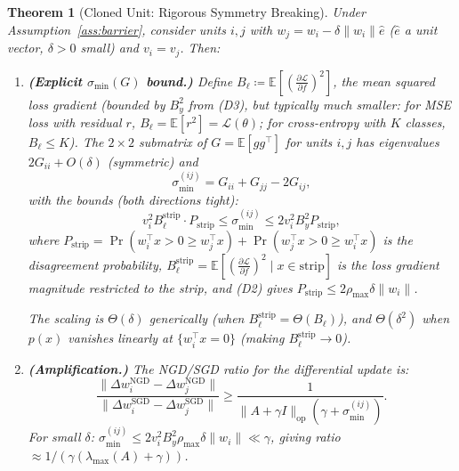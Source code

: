 \documentclass{article}
\providecommand{\E}{\mathbb{E}}
\providecommand{\norm}[1]{\lVert #1 \rVert}
\theoremstyle{plain}
\newtheorem{theorem}{Theorem}
\theoremstyle{definition}
\theoremstyle{remark}
\begin{document}
\begin{theorem}[Cloned Unit: Rigorous Symmetry Breaking]
\label{thm:clone}
Under Assumption~\ref{ass:barrier}, consider units $i, j$ with $w_j = w_i - \delta\norm{w_i}\hat{e}$ ($\hat{e}$ a unit vector, $\delta > 0$ small) and $v_i = v_j$. Then:

\begin{enumerate}
\item[(a)] \textbf{(Explicit $\sigma_{\min}(G)$ bound.)} Define $B_\ell \coloneqq \E[(\frac{\partial\mathcal{L}}{\partial f})^2]$, the mean squared loss gradient (bounded by $B_y^2$ from (D3), but typically much smaller: for MSE loss with residual $r$, $B_\ell = \E[r^2] = \mathcal{L}(\theta)$; for cross-entropy with $K$ classes, $B_\ell \leq K$). The $2 \times 2$ submatrix of $G = \E[gg^\top]$ for units $i, j$ has eigenvalues $2G_{ii} + O(\delta)$ (symmetric) and
\begin{equation}
\label{eq:sigma_min_G}
    \sigma_{\min}^{(ij)} = G_{ii} + G_{jj} - 2G_{ij},
\end{equation}
with the bounds (both directions tight):
\begin{equation}
\label{eq:sigma_min_bounds}
    v_i^2 B_\ell^{\mathrm{strip}} \cdot P_{\mathrm{strip}} \leq \sigma_{\min}^{(ij)} \leq 2v_i^2 B_y^2 P_{\mathrm{strip}},
\end{equation}
where $P_{\mathrm{strip}} = \Pr(w_i^\top x > 0 \geq w_j^\top x) + \Pr(w_j^\top x > 0 \geq w_i^\top x)$ is the disagreement probability, $B_\ell^{\mathrm{strip}} = \E[(\frac{\partial\mathcal{L}}{\partial f})^2 \mid x \in \mathrm{strip}]$ is the loss gradient magnitude restricted to the strip, and (D2) gives $P_{\mathrm{strip}} \leq 2\rho_{\max}\delta\norm{w_i}$.

The scaling is $\Theta(\delta)$ generically (when $B_\ell^{\mathrm{strip}} = \Theta(B_\ell)$), and $\Theta(\delta^2)$ when $p(x)$ vanishes linearly at $\{w_i^\top x = 0\}$ (making $B_\ell^{\mathrm{strip}} \to 0$).

\item[(b)] \textbf{(Amplification.)} The NGD/SGD ratio for the \emph{differential} update is:
\begin{equation}
    \frac{\norm{\Delta w_i^{\mathrm{NGD}} - \Delta w_j^{\mathrm{NGD}}}}{\norm{\Delta w_i^{\mathrm{SGD}} - \Delta w_j^{\mathrm{SGD}}}} \geq \frac{1}{\norm{A+\gamma I}_{\mathrm{op}}(\gamma + \sigma_{\min}^{(ij)})}.
\end{equation}
For small $\delta$: $\sigma_{\min}^{(ij)} \leq 2v_i^2 B_y^2 \rho_{\max}\delta\norm{w_i} \ll \gamma$, giving ratio $\approx 1/(\gamma(\lambda_{\max}(A)+\gamma))$.
\end{enumerate}
\end{theorem}
\end{document}
